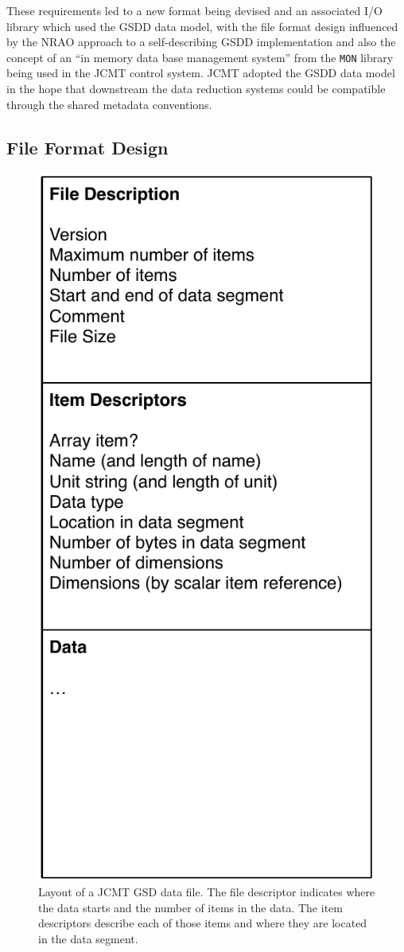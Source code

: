 \documentclass[final,authoryear,5p,times,twocolumn]{elsarticle}
\begin{document}
These requirements led to a new format being devised and an associated
I/O library which used the GSDD data model, with the file format design
influenced by the NRAO approach to a self-describing GSDD
implementation and also the concept of an ``in memory data base
management system'' from the \texttt{MON} library being used in the
JCMT control system.  JCMT adopted the GSDD data model in the hope
that downstream the data reduction systems could be compatible through
the shared metadata conventions.

\subsection{File Format Design}

\begin{figure}
\begin{center}
\includegraphics[width=0.5\columnwidth]{gsd-file-layout}
\end{center}
\caption{Layout of a JCMT GSD data file. The file descriptor indicates
where the data starts and the number of items in the data. The item
descriptors describe each of those items and where they are located in
the data segment.}
\label{fig:jcmtgsd}
\end{figure}
\end{document}
